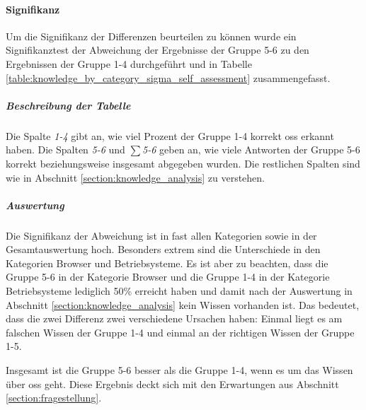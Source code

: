 \documentclass[a4paper]{article}
\begin{document}
                \paragraph{Signifikanz}
                    Um die Signifikanz der Differenzen beurteilen zu können wurde ein Signifikanztest der Abweichung der Ergebnisse der Gruppe 5-6 zu den Ergebnissen der Gruppe 1-4 durchgeführt und in Tabelle \ref{table:knowledge_by_category_sigma_self_assessment} zusammengefasst.
                    
                    \subparagraph{Beschreibung der Tabelle}
                        Die Spalte \emph{1-4} gibt an, wie viel Prozent der Gruppe 1-4 korrekt \gls{oss} erkannt haben. Die Spalten \emph{5-6} und \emph{$\sum$5-6} geben an, wie viele Antworten der Gruppe 5-6 korrekt beziehungsweise insgesamt abgegeben wurden. Die restlichen Spalten sind wie in Abschnitt \ref{section:knowledge_analysis} zu verstehen.
                        
                    \subparagraph{Auswertung}
                        Die Signifikanz der Abweichung ist in fast allen Kategorien sowie in der Gesamtauswertung hoch. Besonders extrem sind die Unterschiede in den Kategorien Browser und Betriebsysteme. Es ist aber zu beachten, dass die Gruppe 5-6 in der Kategorie Browser und die Gruppe 1-4 in der Kategorie Betriebsysteme lediglich 50\% erreicht haben und damit nach der Auswertung in Abschnitt \ref{section:knowledge_analysis} kein Wissen vorhanden ist. Das bedeutet, dass die zwei Differenz zwei verschiedene Ursachen haben: Einmal liegt es am falschen Wissen der Gruppe 1-4 und einmal an der richtigen Wissen der Gruppe 1-5.
                        
                        Insgesamt ist die Gruppe 5-6 besser als die Gruppe 1-4, wenn es um das Wissen über \gls{oss} geht. Diese Ergebnis deckt sich mit den Erwartungen aus Abschnitt \ref{section:fragestellung}.
                    
\end{document}
